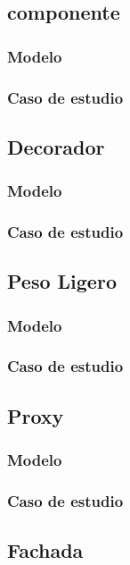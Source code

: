 \newpage

\subsection{componente}
\subsubsection{Modelo}
\newpage
\subsubsection{Caso de estudio}
\newpage

\subsection{Decorador}
\subsubsection{Modelo}
\newpage
\subsubsection{Caso de estudio}
\newpage

\subsection{Peso Ligero}
\subsubsection{Modelo}
\newpage
\subsubsection{Caso de estudio}
\newpage

\subsection{Proxy}
\subsubsection{Modelo}
\newpage
\subsubsection{Caso de estudio}
\newpage

\subsection{Fachada}
